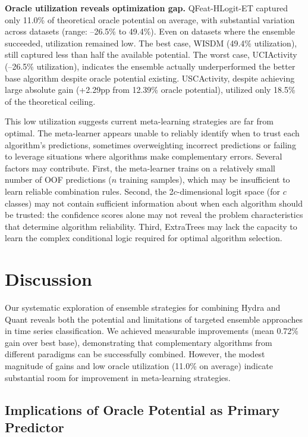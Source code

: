 \documentclass[pdflatex,sn-basic]{sn-jnl}           %
\theoremstyle{thmstyleone}%
\theoremstyle{thmstyletwo}%
\theoremstyle{thmstylethree}%
\begin{document}
\textbf{Oracle utilization reveals optimization gap.} QFeat-HLogit-ET captured only 11.0\% of theoretical oracle potential on average, with substantial variation across datasets (range: --26.5\% to 49.4\%). Even on datasets where the ensemble succeeded, utilization remained low. The best case, WISDM (49.4\% utilization), still captured less than half the available potential. The worst case, UCIActivity (--26.5\% utilization), indicates the ensemble actually underperformed the better base algorithm despite oracle potential existing. USCActivity, despite achieving large absolute gain (+2.29pp from 12.39\% oracle potential), utilized only 18.5\% of the theoretical ceiling.

This low utilization suggests current meta-learning strategies are far from optimal. The meta-learner appears unable to reliably identify when to trust each algorithm's predictions, sometimes overweighting incorrect predictions or failing to leverage situations where algorithms make complementary errors. Several factors may contribute. First, the meta-learner trains on a relatively small number of OOF predictions ($n$ training samples), which may be insufficient to learn reliable combination rules. Second, the 2$c$-dimensional logit space (for $c$ classes) may not contain sufficient information about when each algorithm should be trusted: the confidence scores alone may not reveal the problem characteristics that determine algorithm reliability. Third, ExtraTrees may lack the capacity to learn the complex conditional logic required for optimal algorithm selection.


\section{Discussion}\label{sec6}

Our systematic exploration of ensemble strategies for combining Hydra and Quant reveals both the potential and limitations of targeted ensemble approaches in time series classification. We achieved measurable improvements (mean 0.72\% gain over best base), demonstrating that complementary algorithms from different paradigms can be successfully combined. However, the modest magnitude of gains and low oracle utilization (11.0\% on average) indicate substantial room for improvement in meta-learning strategies.

\subsection{Implications of Oracle Potential as Primary Predictor}
\end{document}
